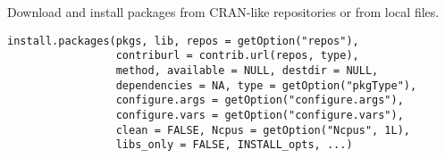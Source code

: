 %
\begin{Description}\relax
Download and install packages from CRAN-like repositories or from
local files.
\end{Description}
%
\begin{Usage}
\begin{verbatim}
install.packages(pkgs, lib, repos = getOption("repos"),
                 contriburl = contrib.url(repos, type),
                 method, available = NULL, destdir = NULL,
                 dependencies = NA, type = getOption("pkgType"),
                 configure.args = getOption("configure.args"),
                 configure.vars = getOption("configure.vars"),
                 clean = FALSE, Ncpus = getOption("Ncpus", 1L),
                 libs_only = FALSE, INSTALL_opts, ...)
\end{verbatim}
\end{Usage}
%
